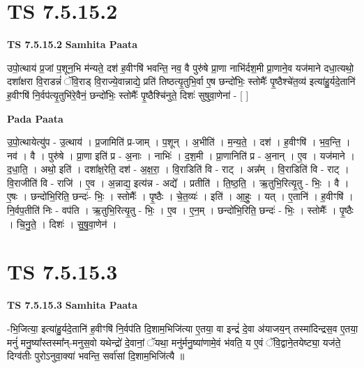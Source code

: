 \documentclass[17pt]{extarticle}
\begin{document}
\section*{ TS 7.5.15.2 }

\textbf{TS 7.5.15.2 } \newline
\textbf{Samhita Paata} \newline

उपो॒त्थाय॑ प्र॒जां प॒शून॒भि म॑न्यते॒ दश॑ ह॒वीꣳषि॑ भवन्ति॒ नव॒ वै पुरु॑षे प्रा॒णा नाभि॑र्दश॒मी प्रा॒णाने॒व यज॑माने दधा॒त्यथो॒ दशा᳚क्षरा वि॒राडन्नं॑ ॅवि॒राड् वि॒राज्ये॒वान्नाद्ये॒ प्रति॑ तिष्ठत्यृ॒तुभि॒र्वा ए॒ष छन्दो॑भिः॒ स्तोमैः᳚ पृ॒ष्ठैश्चे॑त॒व्य॑ इत्या॑हु॒र्यदे॒तानि॑ ह॒वीꣳषि॑ नि॒र्वप॑त्यृ॒तुभि॑रे॒वैनं॒ छन्दो॑भिः॒ स्तोमैः᳚ पृ॒ष्ठैश्चि॑नुते॒ दिशः॑ सुषुवा॒णेना॑ - [  ] \newline

\textbf{Pada Paata} \newline

उ॒पो॒त्थायेत्यु॑प - उ॒त्थाय॑ । प्र॒जामिति॑ प्र-जाम् । प॒शून् । अ॒भीति॑ । म॒न्य॒ते॒ । दश॑ । ह॒वीꣳषि॑ । भ॒व॒न्ति॒ । नव॑ । वै । पुरु॑षे । प्रा॒णा इति॑ प्र - अ॒नाः । नाभिः॑ । द॒श॒मी । प्रा॒णानिति॑ प्र - अ॒नान् । ए॒व । यज॑माने । द॒धा॒ति॒ । अथो॒ इति॑ । दशा᳚क्ष॒रेति॒ दश॑ - अ॒क्ष॒रा॒ । वि॒राडिति॑ वि - राट् । अन्न᳚म् । वि॒राडिति॑ वि - राट् । वि॒राजीति॑ वि - राजि॑ । ए॒व । अ॒न्नाद्य॒ इत्य॑न्न - अद्ये᳚ । प्रतीति॑ । ति॒ष्ठ॒ति॒ । ऋ॒तुभि॒रित्यृ॒तु - भिः॒ । वै । ए॒षः । छन्दो॑भि॒रिति॒ छन्दः॑- भिः॒ । स्तोमैः᳚ । पृ॒ष्ठैः । चे॒त॒व्यः॑ । इति॑ । आ॒हुः॒ । यत् । ए॒तानि॑ । ह॒वीꣳषि॑ । नि॒र्वप॒तीति॑ निः - वप॑ति । ऋ॒तुभि॒रित्यृ॒तु - भिः॒ । ए॒व । ए॒न॒म् । छन्दो॑भि॒रिति॒ छन्दः॑ - भिः॒ । स्तोमैः᳚ । पृ॒ष्ठैः । चि॒नु॒ते॒ । दिशः॑ । सु॒षु॒वा॒णेन॑ ।  \newline




\section*{ TS 7.5.15.3 }

\textbf{TS 7.5.15.3 } \newline
\textbf{Samhita Paata} \newline

-भि॒जित्या॒ इत्या॑हु॒र्यदे॒तानि॑ ह॒वीꣳषि॑ नि॒र्वप॑ति दि॒शाम॒भिजि॑त्या ए॒तया॒ वा इन्द्रं॑ दे॒वा अ॑याजय॒न् तस्मा॑दिन्द्रस॒व ए॒तया॒ मनुं॑ मनु॒ष्या᳚स्तस्मा᳚न्-मनुस॒वो यथेन्द्रो॑ दे॒वानां॒ ॅयथा॒ मनु॑र्मनु॒ष्या॑णामे॒वं भ॑वति॒ य ए॒वं ॅवि॒द्वाने॒तयेष्ट्या॒ यज॑ते॒ दिग्व॑तीः पुरोऽनुवा॒क्या॑ भवन्ति॒ सर्वा॑सां दि॒शाम॒भिजि॑त्यै ॥ \newline
\end{document}
